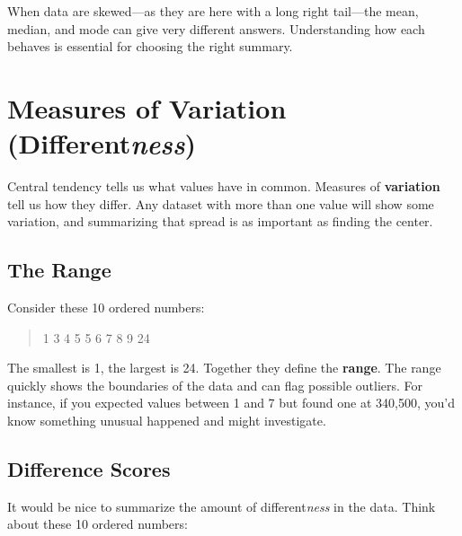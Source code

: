 \documentclass[
  letterpaper,
  DIV=11,
  numbers=noendperiod]{scrreprt}
\begin{document}
\begin{tcolorbox}[enhanced jigsaw, title=\textcolor{quarto-callout-note-color}{\faInfo}\hspace{0.5em}{Takeaway}, colframe=quarto-callout-note-color-frame, colbacktitle=quarto-callout-note-color!10!white, bottomtitle=1mm, leftrule=.75mm, rightrule=.15mm, titlerule=0mm, arc=.35mm, colback=white, opacitybacktitle=0.6, toprule=.15mm, toptitle=1mm, bottomrule=.15mm, coltitle=black, breakable, left=2mm, opacityback=0]

When data are skewed---as they are here with a long right tail---the
mean, median, and mode can give very different answers. Understanding
how each behaves is essential for choosing the right summary.

\end{tcolorbox}

\section{\texorpdfstring{Measures of Variation
(Different\emph{ness})}{Measures of Variation (Differentness)}}\label{measures-of-variation-differentness}

Central tendency tells us what values have in common. Measures of
\textbf{variation} tell us how they differ. Any dataset with more than
one value will show some variation, and summarizing that spread is as
important as finding the center.

\subsection{The Range}\label{the-range}

Consider these 10 ordered numbers:

\begin{quote}
1 3 4 5 5 6 7 8 9 24
\end{quote}

The smallest is 1, the largest is 24. Together they define the
\textbf{range}. The range quickly shows the boundaries of the data and
can flag possible outliers. For instance, if you expected values between
1 and 7 but found one at 340,500, you'd know something unusual happened
and might investigate.

\subsection{Difference Scores}\label{difference-scores}

It would be nice to summarize the amount of different\emph{ness} in the
data. Think about these 10 ordered numbers:
\end{document}
